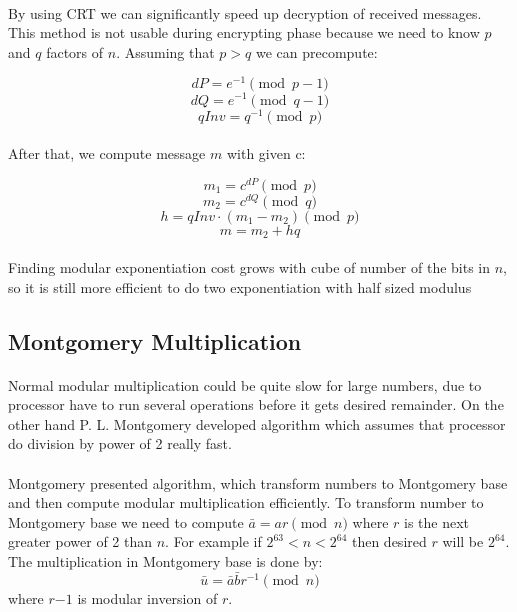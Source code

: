 \documentclass[thesis=B,english]{FITthesis}[2012/10/20]
\begin{document}
{\paragraph*{}
{By using CRT we can significantly speed up decryption of received messages. This method is not usable during encrypting phase because we need to know \(p\) and \(q\) factors of \(n\).
Assuming that \(p>q\) we can precompute:}

\[dP = e^{-1} \pmod{p-1}\]
\[dQ = e^{-1} \pmod{q-1}\]
\[qInv = q^{-1} \pmod{p}\]

\paragraph*{}
{After that, we compute message \(m\) with given c:}

\[m_1 = c^{dP} \pmod{p}\]
\[m_2 = c^{dQ} \pmod{q}\]
\[h = qInv \cdot (m_1 - m_2) \pmod{p}\]  
\[m = m_2 + hq\]

\paragraph*{}
{Finding modular exponentiation cost grows with cube of number of the bits in \(n\), so it is still more efficient to do two exponentiation with half sized modulus}



\subsection{Montgomery Multiplication}

\paragraph*{}
{Normal modular multiplication could be quite slow for large numbers, due to processor have to run several operations before it gets desired remainder. 
On the other hand P. L. Montgomery developed algorithm which assumes that processor do division by power of 2 really fast.}
\paragraph*{}{
Montgomery presented algorithm, which transform numbers to Montgomery base and then compute modular multiplication efficiently.
To transform number to Montgomery base we need to compute \(\bar{a} = ar \pmod{n}\) where \(r\) is the next greater power of 2 than \(n\). For example if \(2^{63} < n < 2^{64}\) 
then desired \(r\) will be \(2^{64}\). The multiplication in Montgomery base is done by: \[\bar{u} = \bar{a}\bar{b}r^{-1} \pmod{n}\] where \(r{-1}\) is modular inversion of \(r\).
}
}
\end{document}
